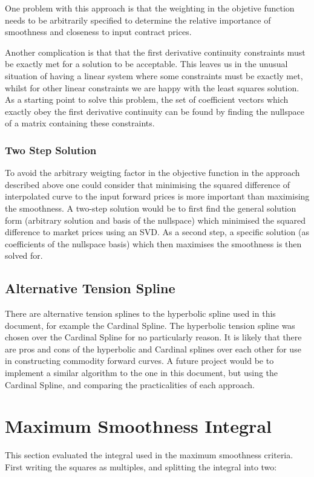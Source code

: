 \documentclass{article}
\begin{document}
\bigskip

One problem with this approach is that the weighting in the objetive function
needs to be arbitrarily specified to determine the relative importance of smoothness
and closeness to input contract prices.

\bigskip

Another complication is that that the first derivative continuity constraints must
be exactly met for a solution to be acceptable. This leaves us in the unusual situation
of having a linear system where some constraints must be exactly met, whilst for other
linear constraints we are happy with the least squares solution. As a starting point
to solve this problem, the set of coefficient vectors which exactly obey the first 
derivative continuity can be found by finding the nullspace of a matrix containing
these constraints.

\subsubsection{Two Step Solution}
To avoid the arbitrary weigting factor in the objective function in the approach 
described above one could consider that minimising the squared difference of interpolated
curve to the input forward prices is more important than maximising the smoothness.
A two-step solution would be to first find the general solution form (arbitrary solution
and basis of the nullspace) which minimised the squared difference to market
prices using an SVD. As a second step, a specific solution (as coefficients of the 
nullspace basis) which then maximises the smoothness is then solved for.

\subsection{Alternative Tension Spline}
There are alternative tension splines to the hyperbolic spline used in this 
document, for example the Cardinal Spline. The hyperbolic tension spline was chosen
over the Cardinal Spline for no particularly reason. It is likely that there are pros
and cons of the hyperbolic and Cardinal splines over each other for use in constructing commodity
forward curves. A future project would be to implement a similar algorithm to the one
in this document, but using the Cardinal Spline, and comparing the practicalities of each approach.

\newpage
\appendix
\appendixpage
\section{Maximum Smoothness Integral}
\label{appendix:max_smooth_integral}
This section evaluated the integral used in the maximum smoothness criteria. First writing
the squares as multiples, and splitting the integral into two:
\end{document}
